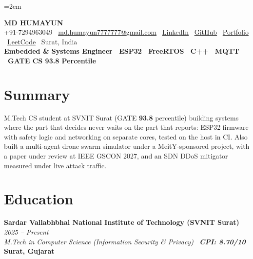 \documentclass[10pt, legalpaper]{article}
\newcommand{\eduentry}[4]{%
    \noindent\textbf{#1} \hfill \textit{\color{medgray}#2}\\[1pt]
    \noindent\textit{\color{darkgray}#3} \hfill \textbf{#4}\\[2pt]
}
\begin{document}
\raggedbottom
{}
\emergencystretch=2em
\pagestyle{empty}

\begin{center}
{\LARGE\bfseries MD HUMAYUN}\\[2pt]
{\small
+91-7294963049 \textbar\
\href{mailto:md.humayun7777777@gmail.com}{md.humayun7777777@gmail.com} \textbar\
\href{https://www.linkedin.com/in/md-humayun-82051521a/}{LinkedIn} \textbar\
\href{https://github.com/mdhumayun7}{GitHub} \textbar\
\href{https://mdhumayun7.github.io/MD-HUMAYUN-PORTFOLIO/}{Portfolio} \textbar\
\href{https://leetcode.com/u/mdhumayun7/}{LeetCode} \textbar\
Surat, India
}\\[3pt]
{\small\textbf{Embedded \& Systems Engineer \textbar\ ESP32 \textbar\ FreeRTOS \textbar\ C++ \textbar\ MQTT \textbar\ GATE CS 93.8 Percentile}}
\end{center}

\vspace{-2pt}

\section{Summary}

{\small
M.Tech CS student at SVNIT Surat (GATE \textbf{93.8} percentile) building systems where the part that decides never waits on the part that reports: ESP32 firmware with safety logic and networking on separate cores, tested on the host in CI. Also built a multi-agent drone swarm simulator under a MeitY-sponsored project, with a paper under review at IEEE GSCON 2027, and an SDN DDoS mitigator measured under live attack traffic.
}

\section{Education}

\eduentry
{Sardar Vallabhbhai National Institute of Technology (SVNIT Surat)}
{2025 -- Present}
{M.Tech in Computer Science (Information Security \& Privacy) \textbar\ \textbf{CPI: 8.70/10}}
{Surat, Gujarat}
\end{document}
